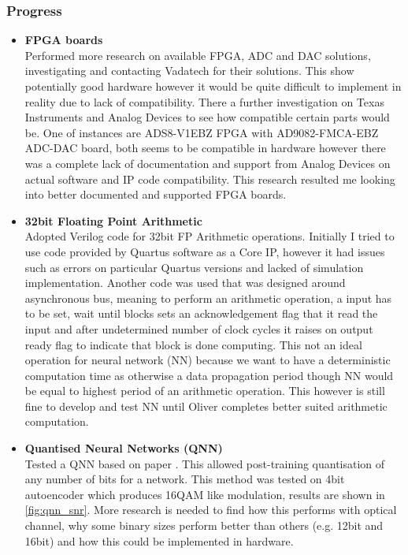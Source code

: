 
\subsubsection{Progress}

\begin{itemize}
    \item \textbf{FPGA boards}\\
    Performed more research on available FPGA, ADC and DAC solutions, investigating and contacting Vadatech for their solutions. This show potentially good hardware however it would be quite difficult to implement in reality due to lack of compatibility. There a further investigation on Texas Instruments and Analog Devices to see how compatible certain parts would be. One of instances are ADS8-V1EBZ FPGA with AD9082-FMCA-EBZ ADC-DAC board, both seems to be compatible in hardware however there was a complete lack of documentation and support from Analog Devices on actual software and IP code compatibility. This research resulted me looking into better documented and supported FPGA boards.
    \item \textbf{32bit Floating Point Arithmetic}\\
    Adopted Verilog code for 32bit FP Arithmetic operations. Initially I tried to use code provided by Quartus software as a Core IP, however it had issues such as errors on particular Quartus versions and lacked of simulation implementation. Another code was used that was designed around asynchronous bus, meaning to perform an arithmetic operation, a input has to be set, wait until blocks sets an acknowledgement flag that it read the input and after undetermined number of clock cycles it raises on output ready flag to indicate that block is done computing. This not an ideal operation for neural network (NN) because we want to have a deterministic computation time as otherwise a data propagation period though NN would be equal to highest period of an arithmetic operation. This however is still fine to develop and test NN until Oliver completes better suited arithmetic computation.
    
    \item \textbf{Quantised Neural Networks (QNN)}\\
    Tested a QNN based on paper \cite{lybrand2020greedy}. This allowed post-training quantisation of any number of bits for a network. This method was tested on 4bit autoencoder which produces 16QAM like modulation, results are shown in \autoref{fig:qnn_snr}. More research is needed to find how this performs with optical channel, why some binary sizes perform better than others (e.g. 12bit and 16bit) and how this could be implemented in hardware.
    

\end{itemize}
